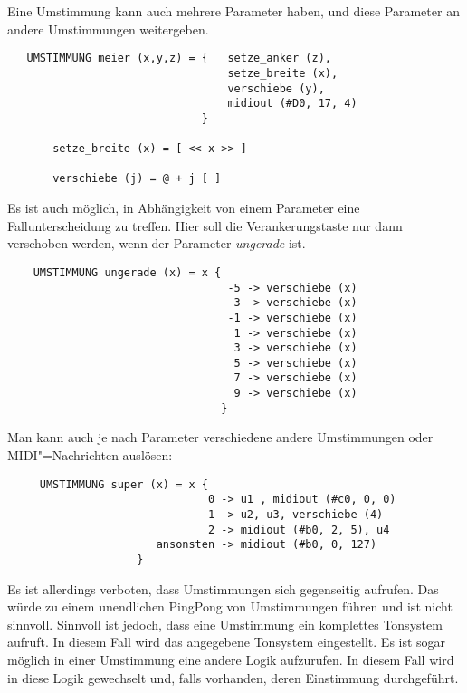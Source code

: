 Eine Umstimmung kann auch mehrere Parameter haben, und
diese Parameter an andere Umstimmungen weitergeben.
\begin{verbatim}
   UMSTIMMUNG meier (x,y,z) = {   setze_anker (z),
                                  setze_breite (x),
                                  verschiebe (y),
                                  midiout (#D0, 17, 4)
                              }

       setze_breite (x) = [ << x >> ]

       verschiebe (j) = @ + j [ ]
\end{verbatim}
Es ist auch möglich, in Abhängigkeit von einem Parameter
eine Fallunterscheidung zu treffen. Hier soll die 
Verankerungstaste nur dann verschoben werden, wenn der 
Parameter \emph{ungerade} ist.
\begin{verbatim}
    UMSTIMMUNG ungerade (x) = x {
                                  -5 -> verschiebe (x)
                                  -3 -> verschiebe (x)
                                  -1 -> verschiebe (x)
                                   1 -> verschiebe (x)
                                   3 -> verschiebe (x)
                                   5 -> verschiebe (x)
                                   7 -> verschiebe (x)
                                   9 -> verschiebe (x)
                                 }
\end{verbatim}
Man kann auch je nach Parameter verschiedene andere Umstimmungen
oder MIDI"=Nachrichten auslösen:
\begin{verbatim}
     UMSTIMMUNG super (x) = x {
                               0 -> u1 , midiout (#c0, 0, 0)
                               1 -> u2, u3, verschiebe (4)
                               2 -> midiout (#b0, 2, 5), u4
                       ansonsten -> midiout (#b0, 0, 127)
                    }
\end{verbatim}
Es ist allerdings verboten, dass Umstimmungen sich gegenseitig
aufrufen. Das würde zu einem unendlichen PingPong von
Umstimmungen führen und ist nicht sinnvoll. Sinnvoll ist jedoch,
dass eine Umstimmung ein komplettes Tonsystem aufruft.
In diesem Fall wird das angegebene Tonsystem eingestellt. Es
ist sogar möglich in einer Umstimmung eine andere
Logik aufzurufen. In diesem Fall wird in diese Logik gewechselt
und, falls vorhanden, deren Einstimmung durchgeführt.

